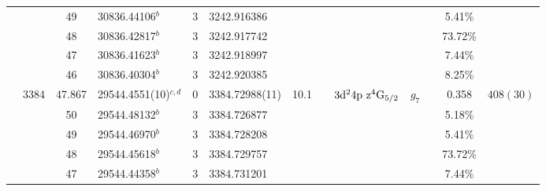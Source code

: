 \begin{table*}
\begin{center}
{\begin{tabular}{:l;l;c;l;c;l;c;l;l;c;c;c;c}
\rowstyle{\itshape}               &        & 49        & 30836.44106$^{b}$                & 3 &   3242.916386      &      & $                                        $ & $                                        $ & $      $ &              & 5.41\%    & $          $\\
\rowstyle{\itshape}               &        & 48        & 30836.42817$^{b}$                & 3 &   3242.917742      &      & $                                        $ & $                                        $ & $      $ &              & 73.72\%   & $          $\\
\rowstyle{\itshape}               &        & 47        & 30836.41623$^{b}$                & 3 &   3242.918997      &      & $                                        $ & $                                        $ & $      $ &              & 7.44\%    & $          $\\
\rowstyle{\itshape}               &        & 46        & 30836.40304$^{b}$                & 3 &   3242.920385      &      & $                                        $ & $                                        $ & $      $ &              & 8.25\%    & $          $\\
                                  & 3384   & 47.867    & 29544.4551(10)$^{c,d}$           & 0 &    3384.72988(11)  & 10.1 & $                                        $ & $3\rm{d}^24\rm{p~z}^4\rm{G}_{5/2}        $ & $g_{7} $ &              & 0.358     & $  408(30) $\\
\rowstyle{\itshape}               &        & 50        & 29544.48132$^{b}$                & 3 &   3384.726877      &      & $                                        $ & $                                        $ & $      $ &              & 5.18\%    & $          $\\
\rowstyle{\itshape}               &        & 49        & 29544.46970$^{b}$                & 3 &   3384.728208      &      & $                                        $ & $                                        $ & $      $ &              & 5.41\%    & $          $\\
\rowstyle{\itshape}               &        & 48        & 29544.45618$^{b}$                & 3 &   3384.729757      &      & $                                        $ & $                                        $ & $      $ &              & 73.72\%   & $          $\\
\rowstyle{\itshape}               &        & 47        & 29544.44358$^{b}$                & 3 &   3384.731201      &      & $                                        $ & $                                        $ & $      $ &              & 7.44\%    & $          $\\

\end{tabular}}
\end{center}
\end{table*}
